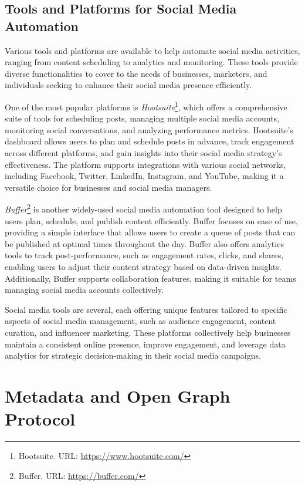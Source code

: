 \subsection{Tools and Platforms for Social Media Automation}
\label{subsec:tools_and_platforms_for_social_media_automation}
Various tools and platforms are available to help automate social media activities, ranging from content scheduling to analytics and monitoring.
These tools provide diverse functionalities to cover to the needs of businesses, marketers, and individuals seeking to enhance their social media presence efficiently.

One of the most popular platforms is \textit{Hootsuite}\footnote{Hootsuite. URL: \url{https://www.hootsuite.com/}}, which offers a comprehensive suite of tools for scheduling posts, managing multiple social media accounts, monitoring social conversations, and analyzing performance metrics.
Hootsuite's dashboard allows users to plan and schedule posts in advance, track engagement across different platforms, and gain insights into their social media strategy's effectiveness.
The platform supports integrations with various social networks, including Facebook, Twitter, LinkedIn, Instagram, and YouTube, making it a versatile choice for businesses and social media managers.

\textit{Buffer}\footnote{Buffer. URL: \url{https://buffer.com/}} is another widely-used social media automation tool designed to help users plan, schedule, and publish content efficiently.
Buffer focuses on ease of use, providing a simple interface that allows users to create a queue of posts that can be published at optimal times throughout the day.
Buffer also offers analytics tools to track post-performance, such as engagement rates, clicks, and shares, enabling users to adjust their content strategy based on data-driven insights.
Additionally, Buffer supports collaboration features, making it suitable for teams managing social media accounts collectively.

Social media tools are several, each offering unique features tailored to specific aspects of social media management, such as audience engagement, content curation, and influencer marketing.
These platforms collectively help businesses maintain a consistent online presence, improve engagement, and leverage data analytics for strategic decision-making in their social media campaigns.


\section{Metadata and Open Graph Protocol}
\label{sec:metadata_open_graph}

